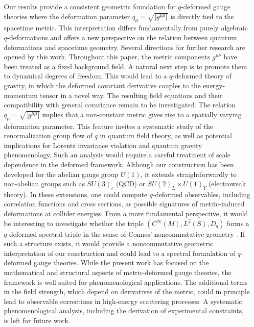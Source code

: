 \documentclass[12pt,a4paper]{article}
\theoremstyle{plain}
\theoremstyle{definition}
\begin{document}
Our results provide a consistent geometric foundation for \(q\)-deformed gauge theories where the deformation parameter \(q_\mu = \sqrt{|g^{\mu\mu}|}\) is directly tied to the spacetime metric. This interpretation differs fundamentally from purely algebraic \(q\)-deformations and offers a new perspective on the relation between quantum deformations and spacetime geometry. Several directions for further research are opened by this work. Throughout this paper, the metric components \(g^{\mu\nu}\) have been treated as a fixed background field. A natural next step is to promote them to dynamical degrees of freedom. This would lead to a \(q\)-deformed theory of gravity, in which the deformed covariant derivative couples to the energy-momentum tensor in a novel way. The resulting field equations and their compatibility with general covariance remain to be investigated. The relation \(q_\mu = \sqrt{|g^{\mu\mu}|}\) implies that a non-constant metric gives rise to a spatially varying deformation parameter. This feature invites a systematic study of the renormalization group flow of \(q\) in quantum field theory, as well as potential implications for Lorentz invariance violation and quantum gravity phenomenology. Such an analysis would require a careful treatment of scale dependence in the deformed framework. Although our construction has been developed for the abelian gauge group \(U(1)\), it extends straightforwardly to non-abelian groups such as \(SU(3)_c\) (QCD) or \(SU(2)_L \times U(1)_Y\) (electroweak theory). In these extensions, one could compute \(q\)-deformed observables, including correlation functions and cross sections, as possible signatures of metric-induced deformations at collider energies.
From a more fundamental perspective, it would be interesting to investigate whether the triple \((C^\infty(M), L^2(S), D_q)\) forms a \(q\)-deformed spectral triple in the sense of Connes' noncommutative geometry \cite{Connes1994}. If such a structure exists, it would provide a noncommutative geometric interpretation of our construction and could lead to a spectral formulation of \(q\)-deformed gauge theories. While the present work has focused on the mathematical and structural aspects of metric-deformed gauge theories, the framework is well suited for phenomenological applications. The additional terms in the field strength, which depend on derivatives of the metric, could in principle lead to observable corrections in high-energy scattering processes. A systematic phenomenological analysis, including the derivation of experimental constraints, is left for future work.
\end{document}
